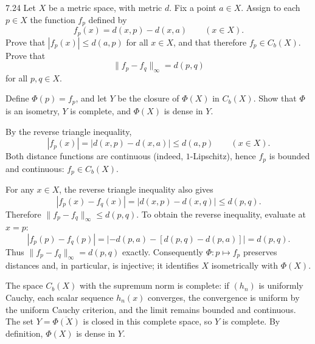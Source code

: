 \documentclass[11pt, oneside]{article}
\begin{document}
\begin{exercise}{7.24}
Let $X$ be a metric space, with metric $d$. Fix a point $a\in X$. Assign to each $p\in X$ the function $f_p$ defined by
\[
 f_p(x)=d(x, p)-d(x, a)\qquad(x\in X).
\]
Prove that $|f_p(x)|\le d(a, p)$ for all $x\in X$, and that therefore $f_p\in C_b(X)$. Prove that
\[
 \|f_p-f_q\|_\infty=d(p, q)
\]
for all $p, q\in X$.

Define $\Phi(p)=f_p$, and let $Y$ be the closure of $\Phi(X)$ in $C_b(X)$. Show that $\Phi$ is an isometry, $Y$ is complete, and $\Phi(X)$ is dense in $Y$.
\end{exercise}
\begin{solution}
By the reverse triangle inequality,
\[
 |f_p(x)|=|d(x, p)-d(x, a)|\le d(a, p)\qquad(x\in X).
\]
Both distance functions are continuous (indeed, $1$-Lipschitz), hence $f_p$ is bounded and continuous: $f_p\in C_b(X)$.

For any $x\in X$, the reverse triangle inequality also gives
\[
 |f_p(x)-f_q(x)|=|d(x, p)-d(x, q)|\le d(p, q).
\]
Therefore $\|f_p-f_q\|_\infty\le d(p, q)$. To obtain the reverse inequality, evaluate at $x=p$:
\[
 |f_p(p)-f_q(p)|
 =|{-d(p, a)}-[d(p, q)-d(p, a)]|=d(p, q).
\]
Thus $\|f_p-f_q\|_\infty=d(p, q)$ exactly. Consequently $\Phi\colon p\mapsto f_p$ preserves distances and, in particular, is injective; it identifies $X$ isometrically with $\Phi(X)$.

The space $C_b(X)$ with the supremum norm is complete: if $(h_n)$ is uniformly Cauchy, each scalar sequence $h_n(x)$ converges, the convergence is uniform by the uniform Cauchy criterion, and the limit remains bounded and continuous. The set $Y=\overline{\Phi(X)}$ is closed in this complete space, so $Y$ is complete. By definition, $\Phi(X)$ is dense in $Y$.
\end{solution}
\end{document}
